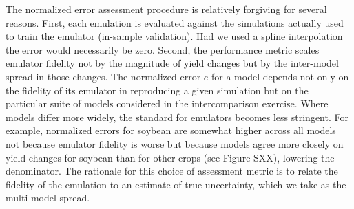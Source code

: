 \documentclass[gmd, manuscript]{copernicus} %
\begin{document}
The normalized error assessment procedure is relatively forgiving for several reasons. 
First, each emulation is evaluated against the simulations actually used to train the emulator (in-sample validation). 
Had we used a spline interpolation the error would necessarily be zero. 
Second, the performance metric scales emulator fidelity not by the magnitude of yield changes but by the inter-model spread in those changes. 
The normalized error $e$ for a model depends not only on the fidelity of its emulator in reproducing a given simulation but on the particular suite of models considered in the intercomparison exercise. 
Where models differ more widely, the standard for emulators becomes less stringent. 
For example, normalized errors for soybean are somewhat higher across all models not because emulator fidelity is worse but because models agree more closely on yield changes for soybean than for other crops (see Figure SXX), lowering the denominator.
The rationale for this choice of assessment metric is to relate the fidelity of the emulation to an estimate of true uncertainty, which we take as the multi-model spread. 
\end{document}
